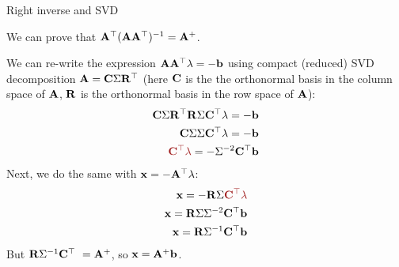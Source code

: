 \documentclass{beamer}
\begin{document}
\begin{frame}{Right inverse and SVD}
	\begin{flushleft}
		
		We can prove that $ \mathbf{A}^\top  (\mathbf{A} \mathbf{A}^\top )^{-1} = \mathbf{A}^+$.
		
		\bigskip
		
		We can re-write the expression $\mathbf{A} \mathbf{A}^\top  \lambda= -\mathbf{b}$ using compact (reduced) SVD decomposition $\mathbf{A} = \mathbf{C}\Sigma\mathbf{R}^\top$ (here $\mathbf{C}$ is the the orthonormal basis in the column space of $\mathbf{A}$, $\mathbf{R}$ is the orthonormal basis in the row space of $\mathbf{A}$):
		\begin{align}
			\bo{C}\Sigma\bo{R}\T \bo{R}\Sigma\bo{C}\T  \lambda= -\bo{b}
			\\
			\bo{C}\Sigma \Sigma\bo{C}\T  \lambda= -\bo{b}
			\\
			\textcolor{mydarkred}{\bo{C}\T  \lambda}= -\Sigma^{-2} \bo{C}\T \bo{b}
		\end{align}				
		Next, we do the same with $\mathbf{x} = -\mathbf{A}^\top  \lambda$:
		\begin{align}
			\bo{x} = -\bo{R}\Sigma\textcolor{mydarkred}{\bo{C}\T  \lambda}
			\\
			\bo{x} = \bo{R}\Sigma\Sigma^{-2} \bo{C}\T \bo{b}
			\\
			\bo{x} = \bo{R}\Sigma^{-1} \bo{C}\T \bo{b}
		\end{align}				
		But $ \mathbf{R}\Sigma^{-1} \mathbf{C}^\top \ = \mathbf{A}^+$, so $\mathbf{x} =\mathbf{A}^+ \mathbf{b}$. 
		
	\end{flushleft}
\end{frame}
\end{document}
